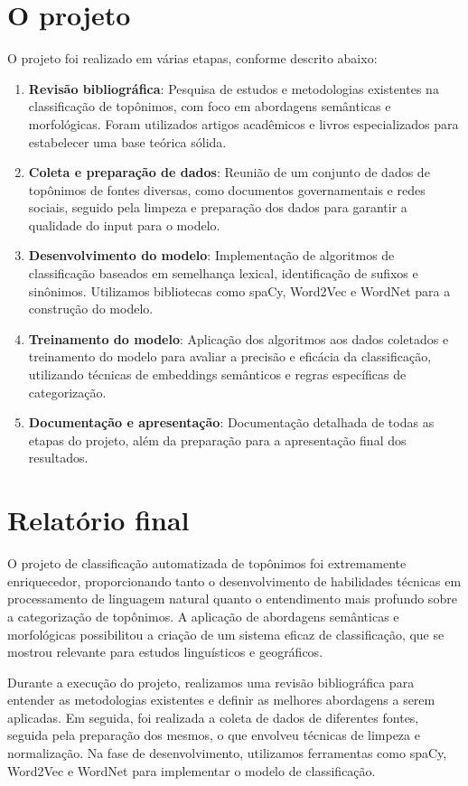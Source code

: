 \documentclass{article}
\begin{document}
\section*{O projeto}
O projeto foi realizado em várias etapas, conforme descrito abaixo:
\begin{enumerate}
\item \textbf{Revisão bibliográfica}: Pesquisa de estudos e metodologias existentes na classificação de topônimos, com foco em abordagens semânticas e morfológicas. Foram utilizados artigos acadêmicos e livros especializados para estabelecer uma base teórica sólida.
\item \textbf{Coleta e preparação de dados}: Reunião de um conjunto de dados de topônimos de fontes diversas, como documentos governamentais e redes sociais, seguido pela limpeza e preparação dos dados para garantir a qualidade do input para o modelo.
\item \textbf{Desenvolvimento do modelo}: Implementação de algoritmos de classificação baseados em semelhança lexical, identificação de sufixos e sinônimos. Utilizamos bibliotecas como spaCy, Word2Vec e WordNet para a construção do modelo.
\item \textbf{Treinamento do modelo}: Aplicação dos algoritmos aos dados coletados e treinamento do modelo para avaliar a precisão e eficácia da classificação, utilizando técnicas de embeddings semânticos e regras específicas de categorização.
\item \textbf{Documentação e apresentação}: Documentação detalhada de todas as etapas do projeto, além da preparação para a apresentação final dos resultados.
\end{enumerate}

\section*{Relatório final}
O projeto de classificação automatizada de topônimos foi extremamente enriquecedor, proporcionando tanto o desenvolvimento de habilidades técnicas em processamento de linguagem natural quanto o entendimento mais profundo sobre a categorização de topônimos. A aplicação de abordagens semânticas e morfológicas possibilitou a criação de um sistema eficaz de classificação, que se mostrou relevante para estudos linguísticos e geográficos.

Durante a execução do projeto, realizamos uma revisão bibliográfica para entender as metodologias existentes e definir as melhores abordagens a serem aplicadas. Em seguida, foi realizada a coleta de dados de diferentes fontes, seguida pela preparação dos mesmos, o que envolveu técnicas de limpeza e normalização. Na fase de desenvolvimento, utilizamos ferramentas como spaCy, Word2Vec e WordNet para implementar o modelo de classificação.
\end{document}
